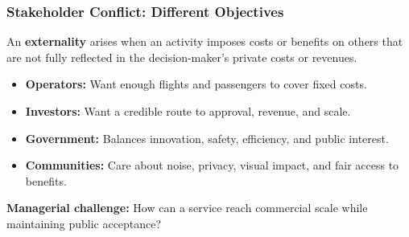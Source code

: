 \documentclass{beamer}
\begin{document}
\begin{frame}[t]
  \frametitle{Stakeholder Conflict: Different Objectives}
  An \textbf{externality} arises when an activity imposes costs or benefits on others that are not fully reflected in the decision-maker's private costs or revenues.
  \begin{itemize}
    \item \textbf{Operators:} Want enough flights and passengers to cover fixed costs.
    \item \textbf{Investors:} Want a credible route to approval, revenue, and scale.
    \item \textbf{Government:} Balances innovation, safety, efficiency, and public interest.
    \item \textbf{Communities:} Care about noise, privacy, visual impact, and fair access to benefits.
  \end{itemize}
  \textbf{Managerial challenge:} How can a service reach commercial scale while maintaining public acceptance?
\end{frame}
\end{document}
